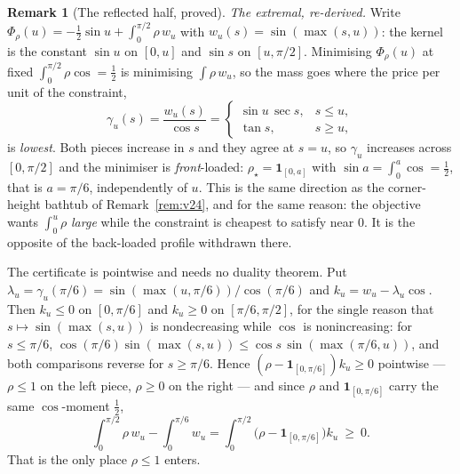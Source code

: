 \documentclass[11pt]{article}
\theoremstyle{definition}
\newtheorem{remark}[theorem]{Remark}
\begin{document}
\begin{remark}[The reflected half, proved]
\emph{The extremal, re-derived.} Write
$\Phi_\rho(u)=-\tfrac12\sin u+\int_0^{\pi/2}\rho\,w_u$ with $w_u(s)=\sin(\max(s,u))$: the
kernel is the constant $\sin u$ on $[0,u]$ and $\sin s$ on $[u,\pi/2]$. Minimising
$\Phi_\rho(u)$ at fixed $\int_0^{\pi/2}\rho\cos=\tfrac12$ is minimising $\int\rho\,w_u$, so the
mass goes where the price per unit of the constraint,
\[
  \gamma_u(s)=\frac{w_u(s)}{\cos s}=
  \begin{cases}\sin u\,\sec s,& s\le u,\\[2pt]\tan s,& s\ge u,\end{cases}
\]
is \emph{lowest}. Both pieces increase in $s$ and they agree at $s=u$, so $\gamma_u$ increases
across $[0,\pi/2]$ and the minimiser is \emph{front}-loaded: $\rho_\star=\mathbf 1_{[0,a]}$
with $\sin a=\int_0^a\cos=\tfrac12$, that is $a=\pi/6$, independently of $u$. This is the same
direction as the corner-height bathtub of Remark~\ref{rem:v24}, and for the same reason: the
objective wants $\int_0^u\rho$ \emph{large} while the constraint is cheapest to satisfy near
$0$. It is the opposite of the back-loaded profile withdrawn there.

The certificate is pointwise and needs no duality theorem. Put
$\lambda_u=\gamma_u(\pi/6)=\sin(\max(u,\pi/6))/\cos(\pi/6)$ and $k_u=w_u-\lambda_u\cos$. Then
$k_u\le0$ on $[0,\pi/6]$ and $k_u\ge0$ on $[\pi/6,\pi/2]$, for the single reason that
$s\mapsto\sin(\max(s,u))$ is nondecreasing while $\cos$ is nonincreasing: for $s\le\pi/6$,
$\cos(\pi/6)\sin(\max(s,u))\le\cos s\,\sin(\max(\pi/6,u))$, and both comparisons reverse for
$s\ge\pi/6$. Hence $(\rho-\mathbf 1_{[0,\pi/6]})k_u\ge0$ pointwise --- $\rho\le1$ on the left
piece, $\rho\ge0$ on the right --- and since $\rho$ and $\mathbf 1_{[0,\pi/6]}$ carry the same
$\cos$-moment $\tfrac12$,
\[
  \int_0^{\pi/2}\rho\,w_u-\int_0^{\pi/6}w_u
  =\int_0^{\pi/2}\bigl(\rho-\mathbf 1_{[0,\pi/6]}\bigr)k_u\ \ge\ 0 .
\]
That is the only place $\rho\le1$ enters.


\end{remark}
\end{document}
